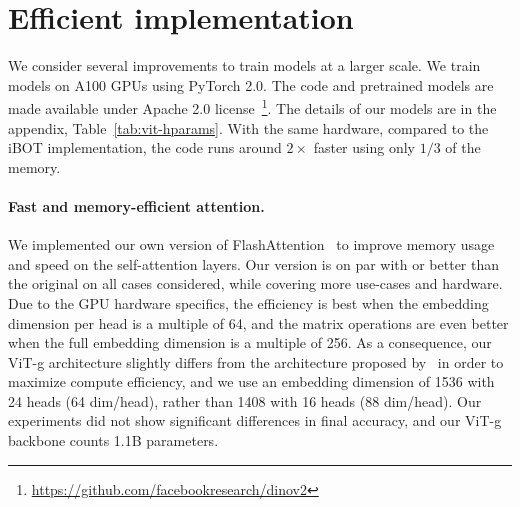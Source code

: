 \section{Efficient implementation}
\label{sec:optim}
We consider several improvements to train models at a larger scale.
We train models on A100 GPUs using PyTorch 2.0.
The code and pretrained models are made available under Apache 2.0 license~\footnote{\url{https://github.com/facebookresearch/dinov2}}.
The details of our models are in the appendix, Table~\ref{tab:vit-hparams}. With the same hardware, compared to the iBOT implementation, the \OURS{} code runs around $2\times$ faster using only $1/3$ of the memory.

\paragraph{Fast and memory-efficient attention.} 
We implemented our own version of FlashAttention~\citep{dao2022flashattention} to improve memory usage and speed on the self-attention layers. 
Our version is on par with or better than the original on all cases considered, while covering more use-cases and hardware. 
Due to the GPU hardware specifics, the efficiency is best when the embedding dimension per head is a multiple of 64, and the matrix operations are even better when the full embedding dimension is a multiple of 256. 
As a consequence, our ViT-g architecture slightly differs from the architecture proposed by~\cite{zhai2022scaling} in order to maximize compute efficiency, and we use an embedding dimension of 1536 with 24 heads (64 dim/head), rather than 1408 with 16 heads (88 dim/head). Our experiments did not show significant differences in final accuracy, and our ViT-g backbone counts 1.1B parameters.


